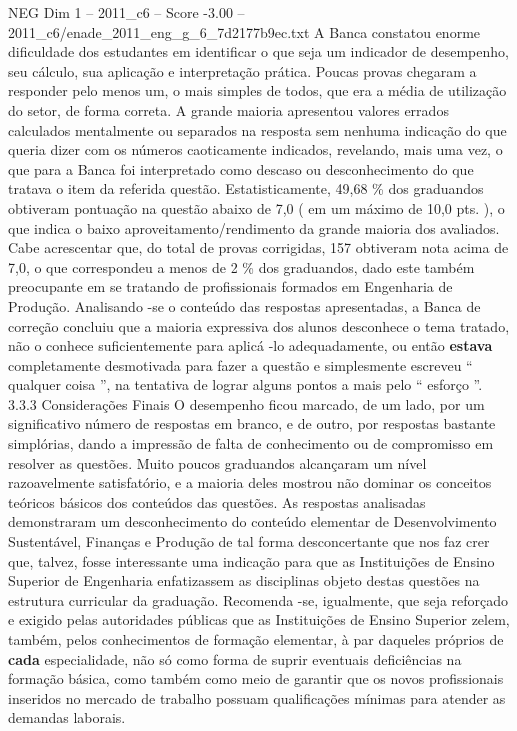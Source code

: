 \begin{textsample}{NEG Dim 1 – 2011\_c6 – Score -3.00 – 2011\_c6/enade\_2011\_eng\_g\_6\_7d2177b9ec.txt}
A Banca constatou enorme dificuldade dos estudantes em identificar o que seja um indicador de desempenho, seu cálculo, sua aplicação e interpretação prática.
Poucas provas chegaram a responder pelo menos um, o mais simples de todos, que era a média de utilização do setor, de forma correta.
A grande maioria apresentou valores errados calculados mentalmente ou separados na resposta sem nenhuma indicação do que queria dizer com os números caoticamente indicados, revelando, mais uma vez, o que para a Banca foi interpretado como descaso ou desconhecimento do que tratava o item da referida questão.
Estatisticamente, 49,68 \% dos graduandos obtiveram pontuação na questão abaixo de 7,0 ( em um máximo de 10,0 pts. ), o que indica o baixo aproveitamento/rendimento da grande maioria dos avaliados.
Cabe acrescentar que, do total de provas corrigidas, 157 obtiveram nota acima de 7,0, o que correspondeu a menos de 2 \% dos graduandos, dado este também preocupante em se tratando de profissionais formados em Engenharia de Produção.
Analisando -se o conteúdo das respostas apresentadas, a Banca de correção concluiu que a maioria expressiva dos alunos desconhece o tema tratado, não o conhece suficientemente para aplicá -lo adequadamente, ou então \textbf{estava} completamente desmotivada para fazer a questão e simplesmente escreveu “ qualquer coisa ”, na tentativa de lograr alguns pontos a mais pelo “ esforço ”. 3.3.3 Considerações Finais O desempenho ficou marcado, de um lado, por um significativo número de respostas em branco, e de outro, por respostas bastante simplórias, dando a impressão de falta de conhecimento ou de compromisso em resolver as questões.
Muito poucos graduandos alcançaram um nível razoavelmente satisfatório, e a maioria deles mostrou não dominar os conceitos teóricos básicos dos conteúdos das questões.
As respostas analisadas demonstraram um desconhecimento do conteúdo elementar de Desenvolvimento Sustentável, Finanças e Produção de tal forma desconcertante que nos faz crer que, talvez, fosse interessante uma indicação para que as Instituições de Ensino Superior de Engenharia enfatizassem as disciplinas objeto destas questões na estrutura curricular da graduação.
Recomenda -se, igualmente, que seja reforçado e exigido pelas autoridades públicas que as Instituições de Ensino Superior zelem, também, pelos conhecimentos de formação elementar, à par daqueles próprios de \textbf{cada} especialidade, não só como forma de suprir eventuais deficiências na formação básica, como também como meio de garantir que os novos profissionais inseridos no mercado de trabalho possuam qualificações mínimas para atender as demandas laborais.

\end{textsample}
